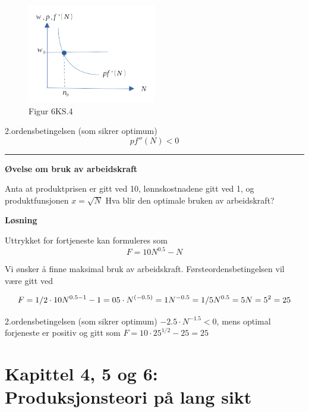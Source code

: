 \documentclass[
  letterpaper,
  DIV=11,
  numbers=noendperiod]{scrartcl}
\begin{document}
\begin{figure}[H]

{\centering \includegraphics[width=0.5\textwidth,height=\textheight]{drawio/klearb.png}

}

\caption{Figur 6KS.4}

\end{figure}%

2.ordensbetingelsen (som sikrer optimum) \[
pf''(N) < 0
\]

\begin{center}\rule{0.5\linewidth}{0.5pt}\end{center}

\textbf{Øvelse om bruk av arbeidskraft}

Anta at produktprisen er gitt ved 10, lønnskostnadene gitt ved 1, og
produktfunsjonen \(x=\sqrt{N}\) Hva blir den optimale bruken av
arbeidskraft?

\textbf{Løsning}

Uttrykket for fortjeneste kan formuleres som \[
F=10N^{0.5}-N
\]

Vi ønsker å finne maksimal bruk av arbeidskraft. Førsteordensbetingelsen
vil være gitt ved

\begin{equation*}
F=1/2\cdot 10N^{0.5-1}-1=0 \\
5\cdot N^{(-0.5)}=1 \\
N^{-0.5}=1/5 \\
N^{0.5}=5 \\
N=5^2 = 25
\end{equation*}

2.ordensbetingelsen (som sikrer optimum) \(-2.5\cdot N^{-1.5} < 0\),
mens optimal forjeneste er positiv og gitt som
\(F=10\cdot 25^{1/2}-25=25\)

\section{Kapittel 4, 5 og 6: Produksjonsteori på lang
sikt}\label{kapittel-4-5-og-6-produksjonsteori-puxe5-lang-sikt}
\end{document}
